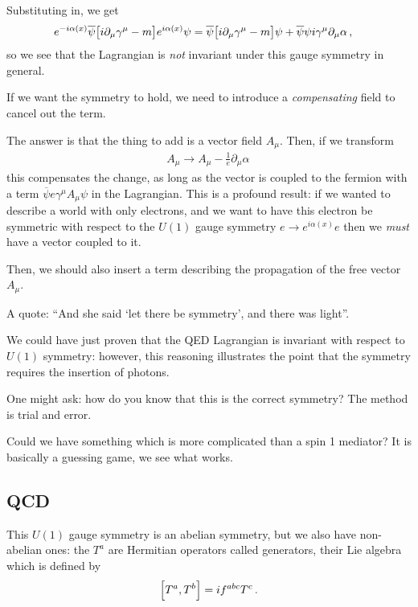 \documentclass[main.tex]{subfiles}
\begin{document}
Substituting in, we get 
%
\begin{align}
e^{-i \alpha (x)} \overline{\psi} \qty[i \partial_{\mu } \gamma^{\mu } - m] e^{i \alpha (x)} \psi  
&= 
\overline{\psi} \qty[i \partial_{\mu } \gamma^{\mu } - m] \psi  
 + \overline{\psi} \psi i \gamma^{\mu }\partial_{\mu } \alpha 
\,,
\end{align}
%
so we see that the Lagrangian is \emph{not} invariant under this gauge symmetry in general. 

If we want the symmetry to hold, we need to introduce a \emph{compensating} field to cancel out the term.

The answer is that the thing to add is a vector field \(A_{\mu }\). 
Then, if we transform 
%
\begin{align}
A_{\mu } \to A_{\mu } - \frac{1}{e} \partial_{\mu } \alpha 
\,
\end{align}
%
this compensates the change, as long as the vector is coupled to the fermion with a term \(\overline{\psi} e \gamma^{\mu } A_{\mu } \psi \) in the Lagrangian. 
This is a profound result: if we wanted to describe a world with only electrons, and we want to have this electron be symmetric with respect to the \(U(1)\) gauge symmetry \(e \to e^{i \alpha (x)} e\) then we \emph{must} have a vector coupled to it. 

Then, we should also insert a term describing the propagation of the free vector \(A_{\mu }\). 

A quote: ``And she said `let there be symmetry', and there was light''.

We could have just proven that the QED Lagrangian is invariant with respect to \(U(1)\) symmetry: however, this reasoning illustrates the point that the symmetry requires the insertion of photons. 

One might ask: how do you know that this is the correct symmetry? 
The method is trial and error. 

Could we have something which is more complicated than a spin 1 mediator? It is basically a guessing game, we see what works. 

\subsection{QCD}

This \(U(1)\) gauge symmetry is an abelian symmetry, but we also have non-abelian ones: the \(T^{a}\) are Hermitian operators called generators, their Lie algebra which is defined by 
%
\begin{align}
\qty[T^{a}, T^{b}] = if^{abc} T^{c}
\,.
\end{align}
\end{document}
